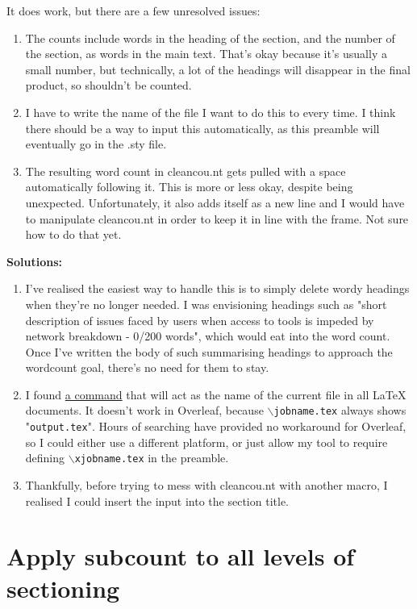 \documentclass[12pt]{article}
\begin{document}
It does work, but there are a few unresolved issues:

\begin{enumerate}
    \item The counts include words in the heading of the section, and the number of the section, as words in the main text. That's okay because it's usually a small number, but technically, a lot of the headings will disappear in the final product, so shouldn't be counted.
    \item I have to write the name of the file I want to do this to every time. I think there should be a way to input this automatically, as this preamble will eventually go in the .sty file.
    \item The resulting word count in cleancou.nt gets pulled with a space automatically following it. This is more or less okay, despite being unexpected. Unfortunately, it also adds itself as a new line and I would have to manipulate cleancou.nt in order to keep it in line with the frame. Not sure how to do that yet.
\end{enumerate}

\textbf{Solutions:}
\begin{enumerate}
    \item I've realised the easiest way to handle this is to simply delete wordy headings when they're no longer needed. I was envisioning headings such as "short description of issues faced by users when access to tools is impeded by network breakdown - 0/200 words", which would eat into the word count. Once I've written the body of such summarising headings to approach the wordcount goal, there's no need for them to stay.
    \item I found \href{https://tex.stackexchange.com/questions/6990/what-is-the-variable-that-contains-the-source-file-name}{a command} that will act as the name of the current file in all LaTeX documents. It doesn't work in Overleaf, because \texttt{$\backslash$jobname.tex} always shows "\texttt{output.tex}". Hours of searching have provided no workaround for Overleaf, so I could either use a different platform, or just allow my tool to require defining \texttt{$\backslash$xjobname.tex} in the preamble.
    \item Thankfully, before trying to mess with cleancou.nt with another macro, I realised I could insert the input into the section title.
\end{enumerate}

\section{\large Apply subcount to all levels of sectioning}
\end{document}
